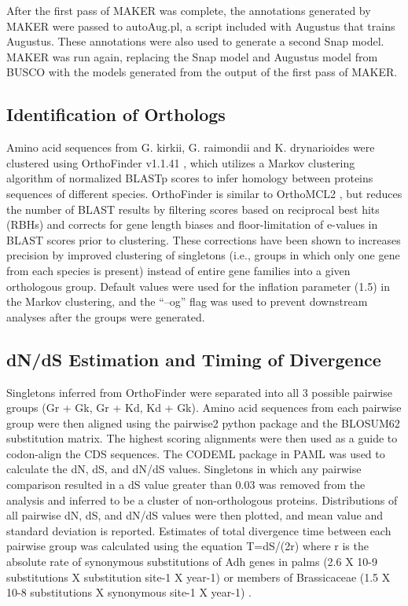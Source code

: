 \documentclass[10pt,letterpaper]{article}
\begin{document}
After the first pass of MAKER was complete, the annotations generated by MAKER
were passed to autoAug.pl, a script included with Augustus that trains Augustus.
These annotations were also used to generate a second Snap model. MAKER was run
again, replacing the Snap model and Augustus model from BUSCO with the models
generated from the output of the first pass of MAKER.

\subsection*{Identification of Orthologs}

Amino acid sequences from G. kirkii, G. raimondii and K. drynarioides were
clustered using OrthoFinder v1.1.41 \cite{Emms2015}, which utilizes a Markov
clustering algorithm of normalized BLASTp scores to infer homology between
proteins sequences of different species. OrthoFinder is similar to OrthoMCL2
\cite{Li2003}, but reduces the number of BLAST results by filtering scores
based on reciprocal best hits (RBHs) and corrects for gene length biases and
floor-limitation of e-values in BLAST scores prior to clustering. These
corrections have been shown to increases precision by improved clustering of
singletons (i.e., groups in which only one gene from each species is present)
instead of entire gene families into a given orthologous group. Default values
were used for the inflation parameter (1.5) in the Markov clustering, and the
“–og” flag was used to prevent downstream analyses after the groups were
generated.


\subsection*{dN/dS Estimation and Timing of Divergence}

Singletons inferred from OrthoFinder were separated into all 3 possible pairwise
groups (Gr + Gk, Gr + Kd, Kd + Gk). Amino acid sequences from each pairwise
group were then aligned using the pairwise2 python package and the BLOSUM62
substitution matrix. The highest scoring alignments were then used as a guide to
codon-align the CDS sequences. The CODEML package in PAML \cite{Yang2007} was
used to calculate the dN, dS, and dN/dS values. Singletons in which any pairwise
comparison resulted in a dS value greater than 0.03 was removed from the
analysis and inferred to be a cluster of non-orthologous proteins. Distributions
of all pairwise dN, dS, and dN/dS values were then plotted, and mean value and
standard deviation is reported. Estimates of total divergence time between each
pairwise group was calculated using the equation T=dS/(2r) where r is the
absolute rate of synonymous substitutions of Adh genes in palms (2.6 X 10-9
substitutions X substitution site-1 X year-1) \cite{Cronn2002} \cite{Morton1996}
or members of Brassicaceae (1.5 X 10-8 substitutions X synonymous site-1 X
year-1) \cite{Koch2000}.
\end{document}
